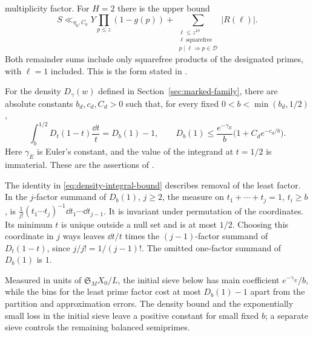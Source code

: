 \begin{hypothesis}
multiplicity factor.  For $H=2$ there is the upper bound
\begin{equation}\label{eq:block-sieve-upper}
 S\ll_{\eta_0,C_0}
 Y\prod_{p\le z}(1-g(p))+
    \sum_{\substack{\ell\le z^{10}\\
                    \ell\ \mathrm{squarefree}\\
                    p\mid\ell\Rightarrow p\in\mathcal D}}
       |R(\ell)|.
\end{equation}
Both remainder sums include only squarefree products of the designated
primes, with $\ell=1$ included.  This is the form stated in
\cite[Lemma~11.1, Equations~(11.2)--(11.3)]{PrimitiveRoot2}.
\end{hypothesis}

\begin{hypothesis}\label{input:density}
For the density $D_\gamma(w)$ defined in Section~\ref{sec:marked-family},
there are absolute constants $b_d,c_d,C_d>0$ such that, for every fixed
$0<b<\min(b_d,1/2)$,
\begin{equation}\label{eq:density-integral-bound}
 \int_b^{1/2}D_t(1-t)\frac{\dd t}{t}=D_b(1)-1,
 \qquad
 D_b(1)\le\frac{e^{-\gamma_E}}{b}
                 \bigl(1+C_de^{-c_d/b}\bigr).
\end{equation}
Here $\gamma_E$ is Euler's constant, and the value of the integrand at
$t=1/2$ is immaterial.  These are the assertions of
\cite[Lemma~11.2, Equations~(11.6)--(11.7)]{PrimitiveRoot2}.
\end{hypothesis}

The identity in \eqref{eq:density-integral-bound} describes removal of
the least factor.  In the $j$-factor summand of $D_b(1)$, $j\ge2$, the
measure on $t_1+\cdots+t_j=1$, $t_i\ge b$, is
$\frac1{j!}(t_1\cdots t_j)^{-1}\dd t_1\cdots\dd t_{j-1}$.
It is invariant under permutation of the coordinates.  Its minimum
$t$ is unique outside a null set and is at most $1/2$.  Choosing this
coordinate in $j$ ways leaves $\dd t/t$ times the $(j-1)$-factor
summand of $D_t(1-t)$, since $j/j!=1/(j-1)!$.  The omitted one-factor
summand of $D_b(1)$ is $1$.

Measured in units of $\mathfrak S_M X_0/L$, the initial sieve below has
main coefficient $e^{-\gamma_E}/b$, while the bins for the least prime factor cost at
most $D_b(1)-1$ apart from the partition and approximation errors.
The density bound and the exponentially small loss in the initial sieve leave a
positive constant for small fixed $b$; a separate sieve controls the
remaining balanced semiprimes.

